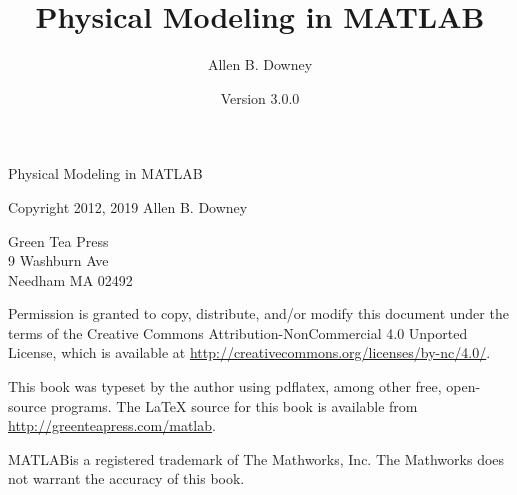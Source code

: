 \documentclass{book}
\newcommand{\myreg}{\textsuperscript{{\tiny \textregistered}}}
\begin{document}
\frontmatter

\newcommand{\thetitle}{Physical Modeling in MATLAB\myreg}
\newcommand{\theversion}{3.0.0}

\title {\thetitle}
\author {Allen B. Downey}
\date {Version \theversion}


\maketitle

\vspace{2in}

\begin{center}
{\Large \thetitle}

\vspace{0.25in}

Copyright 2012, 2019 Allen B. Downey
\end{center}

\vspace{0.25in}

\begin{flushleft}
Green Tea Press       \\
9 Washburn Ave \\
Needham MA 02492
\end{flushleft}

Permission is granted to copy, distribute, and/or modify this document
under the terms of the Creative Commons Attribution-NonCommercial 4.0 Unported License, which is available at \url{http://creativecommons.org/licenses/by-nc/4.0/}.

This book was typeset by the author using pdflatex,
among other free, open-source programs.
The LaTeX source for this book is available from
\url{http://greenteapress.com/matlab}.


MATLAB\myreg is a registered trademark of The
Mathworks, Inc.  The Mathworks does not warrant the accuracy
of this book.



\dominitoc
\dominilof
\dominilot
\tableofcontents
\adjustmtc{}

\mainmatter






























\printindex
\end{document}
